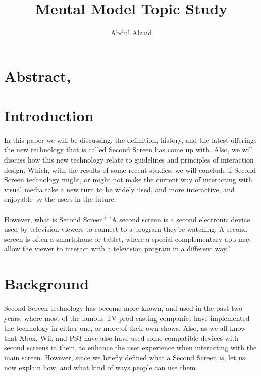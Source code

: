 \documentclass[12pt, oneside]{article}   	%
\title{Mental Model Topic Study}
\author{Abdul Alzaid}
\begin{document}
 \maketitle
  \section{Abstract,}
 \section{Introduction}
\paragraph{}
In this paper we will be discussing, the definition, history, and the latest offerings the new technology that is called Second Screen has come up with. Also, we will discuss how this new technology relate to guidelines and principles of interaction design. Which, with the results of some recent studies, we will conclude if Second Screen technology might, or might not make the current way of interacting with visual media take a new turn to be widely used, and more interactive, and enjoyable by the users in the future. \paragraph{}
However, what is Second Screen?  "A second screen is a second electronic device used by television viewers to connect to a program they're watching. A second screen is often a smartphone or tablet, where a special complementary app may allow the viewer to interact with a television program in a different way."\cite{Second-Screen-Def}
 \section{Background}
 \paragraph{}
 Second Screen technology has become more known, and used in the past two years, where most of the famous TV prod-casting companies have implemented the technology in either one, or more of their own shows.  Also, as we all know that Xbox, Wii, and PS3 have also have used some compatible devices with second screens in them, to enhance the user experience when interacting with the main screen.
 However, since we briefly defined what a Second Screen is, let us now explain how, and what kind of ways people can use them.  
\end{document}
